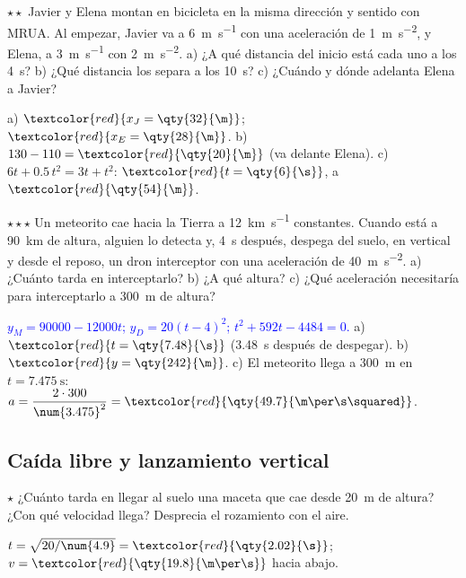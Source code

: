 \begin{exercise}
    \(\star\star\) Javier y Elena montan en bicicleta en la misma dirección y sentido con MRUA. Al empezar, Javier va a
    \qty{6}{\m\per\s} con una aceleración de \qty{1}{\m\per\s\squared}, y Elena, a \qty{3}{\m\per\s} con \qty{2}{\m\per\s\squared}.
    a) ¿A qué distancia del inicio está cada uno a los \qty{4}{\s}? b) ¿Qué distancia los separa a los \qty{10}{\s}? c) ¿Cuándo y
    dónde adelanta Elena a Javier?
    \begin{solu}
        a) \(\textcolor{red}{x_J = \qty{32}{\m}}\); \(\textcolor{red}{x_E = \qty{28}{\m}}\). b) \(130 - 110 = \textcolor{red}{\qty{20}{\m}}\)
        (va delante Elena). c) \(6t + \num{0.5}\,t^2 = 3t + t^2\): \(\textcolor{red}{t = \qty{6}{\s}}\), a \(\textcolor{red}{\qty{54}{\m}}\).
    \end{solu}
\end{exercise}

\begin{exercise}
    \(\star\star\star\) Un meteorito cae hacia la Tierra a \qty{12}{\km\per\s} constantes. Cuando está a \qty{90}{\km} de altura,
    alguien lo detecta y, \qty{4}{\s} después, despega del suelo, en vertical y desde el reposo, un dron interceptor con una
    aceleración de \qty{40}{\m\per\s\squared}. a) ¿Cuánto tarda en interceptarlo? b) ¿A qué altura? c) ¿Qué aceleración necesitaría
    para interceptarlo a \qty{300}{\m} de altura?
    \begin{solu}
        \textcolor{blue}{\(y_M = 90000 - 12000t\); \(y_D = 20(t - 4)^2\); \(t^2 + 592t - 4484 = 0\).} a) \(\textcolor{red}{t = \qty{7.48}{\s}}\)
        (\qty{3.48}{\s} después de despegar). b) \(\textcolor{red}{y = \qty{242}{\m}}\). c) El meteorito llega a \qty{300}{\m} en
        \(t = \qty{7.475}{\s}\): \(a = \dfrac{2 \cdot 300}{\num{3.475}^2} = \textcolor{red}{\qty{49.7}{\m\per\s\squared}}\).
    \end{solu}
\end{exercise}

\subsection{Caída libre y lanzamiento vertical}

\begin{exercise}
    \(\star\) ¿Cuánto tarda en llegar al suelo una maceta que cae desde \qty{20}{\m} de altura? ¿Con qué velocidad llega? Desprecia el
    rozamiento con el aire.
    \begin{solu}
        \(t = \sqrt{20/\num{4.9}} = \textcolor{red}{\qty{2.02}{\s}}\); \(v = \textcolor{red}{\qty{19.8}{\m\per\s}}\) hacia abajo.
    \end{solu}
\end{exercise}

